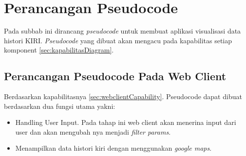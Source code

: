 \section{Perancangan Pseudocode}
\label{sec:psudeoCode}
Pada subbab ini dirancang \textit{pseudocode} untuk membuat aplikasi visualisasi data histori KIRI. \textit{Pseudocode} yang dibuat akan mengacu pada kapabilitas setiap komponent \ref{sec:kapabilitasDiagram}.

\subsection{Perancangan Pseudocode Pada Web Client}
\label{sec:psudeoCodeWebClient}
Berdasarkan kapabilitasnya  \ref{sec:webclientCapability}. Pseudocode dapat dibuat berdasarkan dua fungsi utama yakni:
\begin{itemize}
    \item Handling User Input. Pada tahap ini web client akan menerina input dari user dan akan mengubah nya menjadi \textit{filter params}.
    \item Menampilkan data histori kiri dengan menggunakan \textit{google maps}.
    
\end{itemize} 

